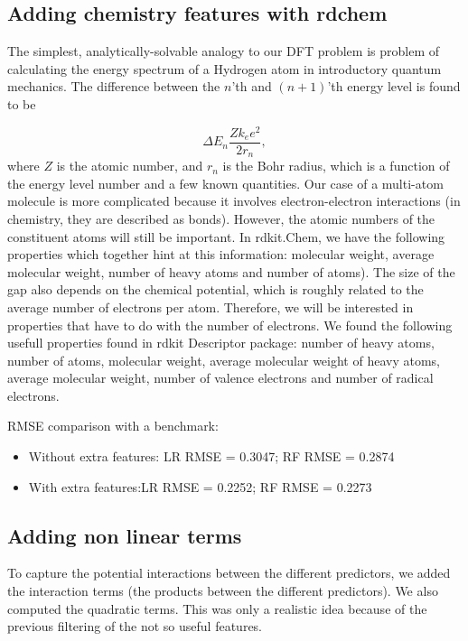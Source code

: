 \documentclass[11pt]{article}
\begin{document}
  \subsection{Adding chemistry features with rdchem}
  The simplest, analytically-solvable analogy to our DFT problem is problem of calculating the energy spectrum of a Hydrogen atom in introductory quantum mechanics.  The difference between the $n$'th and $(n+1)$'th energy level is found to be
  
  \begin{equation}
  \Delta E_n \frac{Zk_e e^2}{2r_n},
  \end{equation} 
where $Z$ is the atomic number, and $r_n$ is the Bohr radius, which is a function of the energy level number and a few known quantities. Our case of a multi-atom molecule is more complicated because it involves electron-electron interactions (in chemistry, they are described as bonds). However, the atomic numbers of the constituent atoms will still be important. In rdkit.Chem, we have the following properties which together hint at this information: molecular weight, average molecular weight, number of heavy atoms and number of atoms). The size of the gap also depends on the chemical potential, which is roughly related to the  average number of electrons per atom. Therefore, we will be interested in properties that have to do with the number of electrons. We found the following usefull properties found in rdkit Descriptor package: number of heavy atoms, number of atoms, molecular weight, average molecular weight of heavy atoms, average molecular weight, number of valence electrons and number of radical electrons.

RMSE comparison with a benchmark: 
\begin{itemize}
\item{Without extra features: LR RMSE = 0.3047;  RF RMSE = 0.2874}
\item{With extra features:LR RMSE = 0.2252;  RF RMSE = 0.2273}
\end{itemize}

  \subsection{Adding non linear terms}
  
    To capture the potential interactions between the different predictors, we added the interaction terms (the products between the
    different predictors). We also computed the quadratic terms.
    This was only a realistic idea because of the previous filtering of the not so useful features.
    
\end{document}
